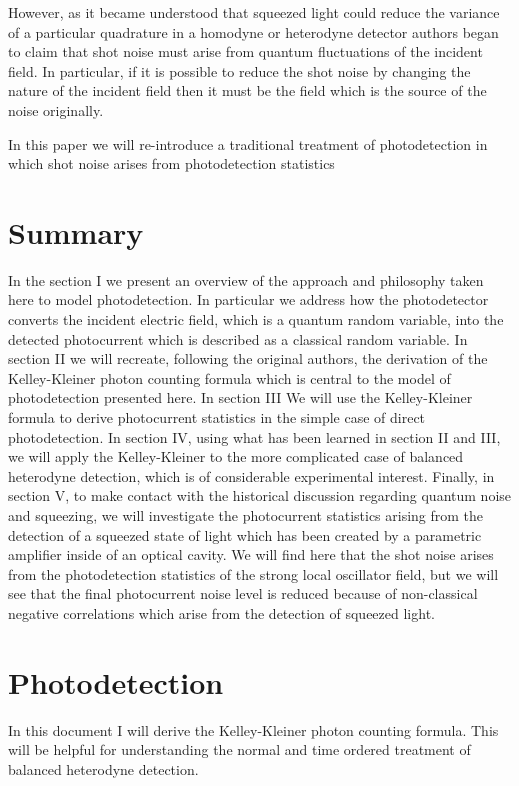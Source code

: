 \documentclass[12pt]{article}
\begin{document}
However, as it became understood that squeezed light could reduce the variance of a particular quadrature in a homodyne or heterodyne detector authors began to claim that shot noise must arise from quantum fluctuations of the incident field. In particular, if it is possible to reduce the shot noise by changing the nature of the incident field then it must be the field which is the source of the noise originally.

In this paper we will re-introduce a traditional treatment of photodetection in which shot noise arises from photodetection statistics

\section*{Summary}
In the section I we present an overview of the approach and philosophy taken here to model photodetection. In particular we address how the photodetector converts the incident electric field, which is a quantum random variable, into the detected photocurrent which is described as a classical random variable. In section II we will recreate, following the original authors, the derivation of the Kelley-Kleiner photon counting formula which is central to the model of photodetection presented here. In section III We will use the Kelley-Kleiner formula to derive photocurrent statistics in the simple case of direct photodetection. In section IV, using what has been learned in section II and III, we will apply the Kelley-Kleiner to the more complicated case of balanced heterodyne detection, which is of considerable experimental interest. Finally, in section V, to make contact with the historical discussion regarding quantum noise and squeezing, we will investigate the photocurrent statistics arising from the detection of a squeezed state of light which has been created by a parametric amplifier inside of an optical cavity. We will find here that the shot noise arises from the photodetection statistics of the strong local oscillator field, but we will see that the final photocurrent noise level is reduced because of non-classical negative correlations  which arise from the detection of squeezed light.

\section{Photodetection}
In this document I will derive the Kelley-Kleiner photon counting formula. This will be helpful for understanding the normal and time ordered treatment of balanced heterodyne detection.
\end{document}
